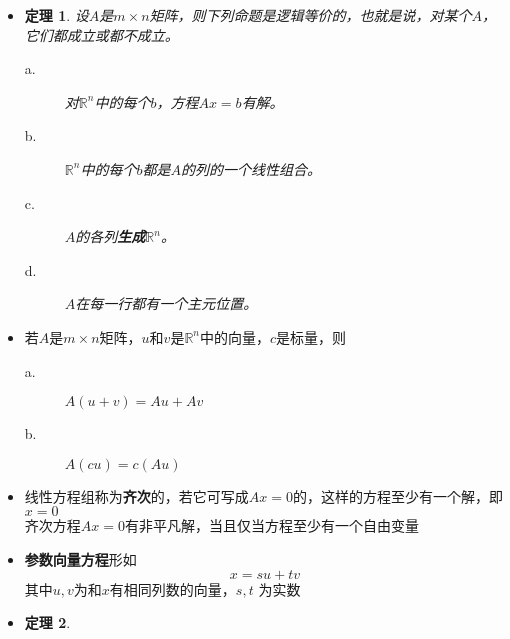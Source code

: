 \documentclass[UTF8]{report}
\newtheorem{theorem}{定理}
\begin{document}
\begin{itemize}
		\item \begin{theorem}
		设$ A $是$ m \times n $矩阵，则下列命题是逻辑等价的，也就是说，对某个$ A $，它们都成立或都不成立。
			\begin{description}
			\item[a.] 对$\mathbb{R}^n$中的每个$ b $，方程$ Ax=b $有解。
			\item[b.] $\mathbb{R}^n$中的每个$ b $都是$ A $的列的一个线性组合。
			\item[c.] $ A $的各列\textbf{生成}$\mathbb{R}^n$。
			\item[d.] $ A $在每一行都有一个主元位置。
			\end{description}
		\end{theorem}
	
		\item 若$ A $是$ m \times n $矩阵，$ u\textrm{和}v\textrm{是}\mathbb{R}^n $中的向量，$ c $是标量，则
			\begin{description}
				\item[a.] $ A(u+v)=Au+Av $
				\item[b.] $ A(cu)=c(Au) $
			\end{description}
		
		\item 线性方程组称为\textbf{齐次}的，若它可写成$ Ax=0 $的，这样的方程至少有一个解，即$ x=0 $ \\
			齐次方程$ Ax=0 $有非平凡解，当且仅当方程至少有一个自由变量
			
		\item \textbf{参数向量方程}形如\begin{displaymath}
		x=su+tv
		\end{displaymath}
		其中$ u,v $为和$ x $有相同列数的向量，$ s,t $ 为实数
		 
		 \item \begin{theorem}
		 	
		 \end{theorem}
	\end{itemize}
\end{document}
